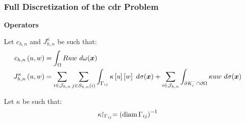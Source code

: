 \begin{frame}
    \frametitle{Full Discretization of the \acrshort{cdr} Problem}

    \vspace*{\fill}
    \begin{center}
        {\color{\accentcolor} \Large \textbf{Operators}}
        \vspace*{0.25cm}

        \begin{minipage}{0.75\textwidth}
            \begin{definition}
                Let $c_{h, n}$ and $J^{\kappa}_{h, n}$ be such that:
                \begin{align*}
                    c_{h, n} \left( u, w \right) &= \int_{\Omega} R u w ~ d \omega(\bm{x}) \\
                    J^{\kappa}_{h, n} \left( u, w \right) &= \sum_{i \in \mathcal{J}_{h, n}} \sum_{j \in \mathcal{S}_{h, n}(i)} \int_{\Gamma_{ij}} \kappa \left[ u \right] \left[ w \right] ~ d \sigma(\bm{x}) + \sum_{i \in \mathcal{J}_{h, n}} \int_{\partial K_i^- \cap \partial \Omega} \kappa u w ~ d \sigma(\bm{x})
                \end{align*}
            \end{definition}
        \end{minipage}
    \end{center}

    \vspace*{\fill}

    \begin{center}
        \begin{minipage}{0.75\textwidth}
            \begin{definition}
                Let $\kappa$ be such that:
                \begin{align*}
                    \kappa \!\!\restriction_{\Gamma_{ij}} = \left( \operatorname*{diam} \Gamma_{ij} \right)^{-1}
                \end{align*}
            \end{definition}
        \end{minipage}
    \end{center}
    \vspace*{\fill}
    
\end{frame}

